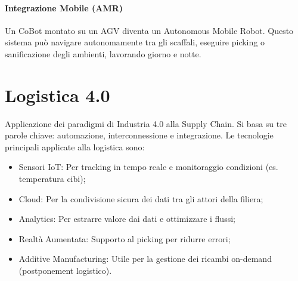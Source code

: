 %
\paragraph{Integrazione Mobile (AMR)} Un CoBot montato su un AGV diventa un Autonomous Mobile Robot. Questo sistema può navigare autonomamente tra gli scaffali, eseguire picking o sanificazione degli ambienti, lavorando giorno e notte.

%
\section{Logistica 4.0}
Applicazione dei paradigmi di Industria 4.0 alla Supply Chain. Si basa su tre parole chiave: automazione, interconnessione e integrazione. Le tecnologie principali applicate alla logistica sono:
\begin{itemize}
    \item Sensori IoT: Per tracking in tempo reale e monitoraggio condizioni (es. temperatura cibi);
    \item Cloud: Per la condivisione sicura dei dati tra gli attori della filiera;
    \item Analytics: Per estrarre valore dai dati e ottimizzare i flussi;
    \item Realtà Aumentata: Supporto al picking per ridurre errori;
    \item Additive Manufacturing: Utile per la gestione dei ricambi on-demand (postponement logistico).
\end{itemize}